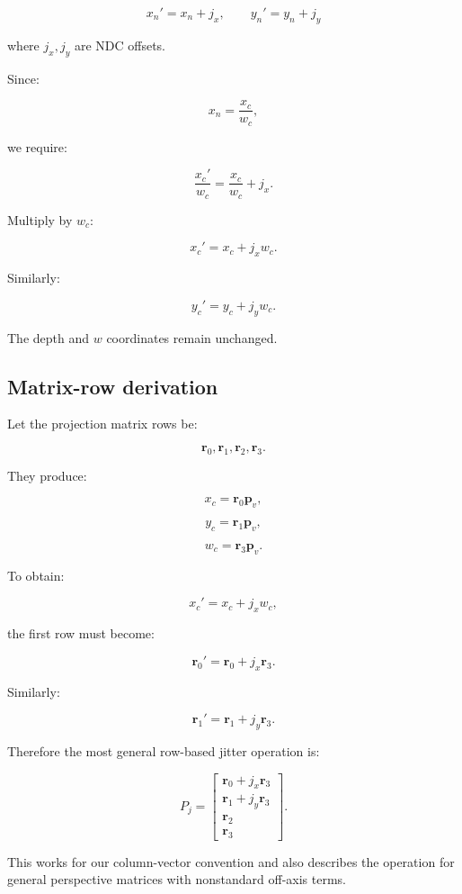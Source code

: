 \[
 \boxed{ x_n'=x_n+j_x, \qquad y_n'=y_n+j_y }
\]

where \(j_x,j_y\) are NDC offsets.

Since:

\[
 x_n=\frac{x_c}{w_c},
\]

we require:

\[
 \frac{x_c'}{w_c}= \frac{x_c}{w_c}+j_x.
\]

Multiply by \(w_c\):

\[
 \boxed{x_c'=x_c+j_xw_c}.
\]

Similarly:

\[
 \boxed{y_c'=y_c+j_yw_c}.
\]

The depth and \(w\) coordinates remain unchanged.

\subsection{Matrix-row derivation}\label{02-foundations-ii-ch036-matrix-row-derivation}

\hypertarget{02-foundations-ii-ch036-matrix-row-derivation}{}

Let the projection matrix rows be:

\[
 \mathbf r_0,\mathbf r_1,\mathbf r_2,\mathbf r_3.
\]

They produce:

\[
 x_c=\mathbf r_0\mathbf p_v,
\]

\[
 y_c=\mathbf r_1\mathbf p_v,
\]

\[
 w_c=\mathbf r_3\mathbf p_v.
\]

To obtain:

\[
 x_c'=x_c+j_xw_c,
\]

the first row must become:

\[
 \boxed{ \mathbf r_0'=\mathbf r_0+j_x\mathbf r_3 }.
\]

Similarly:

\[
 \boxed{ \mathbf r_1'=\mathbf r_1+j_y\mathbf r_3 }.
\]

Therefore the most general row-based jitter operation is:

\[
 \boxed{ P_j= \begin{bmatrix} \mathbf r_0+j_x\mathbf r_3\\ \mathbf r_1+j_y\mathbf r_3\\ \mathbf r_2\\ \mathbf r_3 \end{bmatrix} }.
\]

This works for our column-vector convention and also describes the operation for general perspective matrices with nonstandard off-axis terms.

